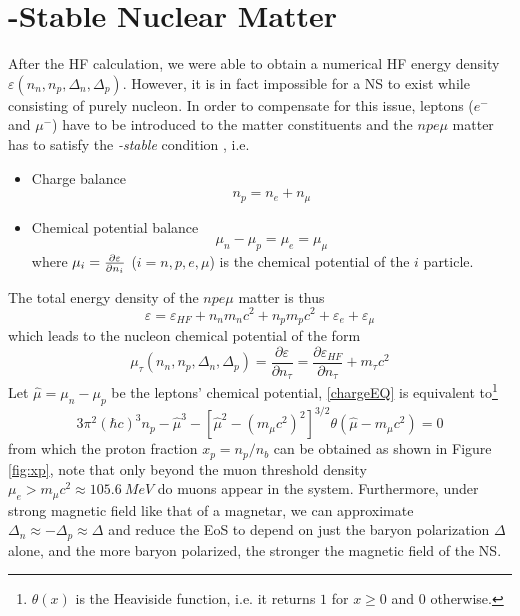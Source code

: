 \section{\textbeta-Stable Nuclear Matter}%
\label{sec:textbeta_stable_nuclear_matter}

After the \gls{HF} calculation, we were able to obtain a numerical \gls{HF} energy density $\varepsilon(n_n,n_p,\Delta_n,\Delta_p)$. However, it is in fact impossible for a \gls{NS} to exist while consisting of purely nucleon. In order to compensate for this issue, leptons ($e^-$ and $\mu^-$) have to be introduced to the matter constituents and the $npe\mu$ matter has to satisfy the \emph{\textbeta-stable} condition \citep{glendenning2012compact}, i.e.
\begin{itemize}
        \item Charge balance
                \begin{equation}
                        n_p = n_e + n_\mu
                        \label{chargeEQ}
                \end{equation}
        \item Chemical potential balance
                \begin{equation}
                        \mu_n - \mu_p = \mu_e = \mu_\mu
                \end{equation}
                where $\mu_i = \pdv{\varepsilon}{n_i}$ ($i=n,p,e,\mu$) is the chemical potential of the $i$ particle.
\end{itemize}
The total energy density of the $npe\mu$ matter is thus
\begin{equation}
        \varepsilon = \varepsilon_{HF} + n_n m_n c^2 + n_p m_p c^2 + \varepsilon_e + \varepsilon_\mu 
\end{equation}
which leads to the nucleon chemical potential of the form
\begin{equation}
        \mu_\tau (n_n,n_p,\Delta_n,\Delta_p) = \frac{\partial \varepsilon}{\partial n_\tau}  = \frac{\partial \varepsilon_{HF}}{\partial n_\tau} + m_\tau c^2
\end{equation}
Let $\hat{\mu} = \mu_n - \mu_p$ be the leptons' chemical potential, \eqref{chargeEQ} is equivalent to\footnote{$\theta(x)$ is the Heaviside function, i.e. it returns $1$ for $x\geq 0$ and $0$ otherwise.}
\begin{equation}
        3\pi^2 (\hbar c)^3 n_p - \hat{\mu}^3 - \left[ \hat{\mu}^2 - (m_\mu c^2)^2 \right]^{3/2} \theta(\hat{\mu} - m_\mu c^2) = 0
\end{equation}
from which the proton fraction $x_p = n_p/n_b$ can be obtained as shown in Figure \ref{fig:xp}, note that only beyond the muon threshold density $\mu_e > m_\mu c^2 \approx 105.6\:MeV$ do muons appear in the system. Furthermore, under strong magnetic field like that of a magnetar, we can approximate $\Delta_n \approx -\Delta_p \approx \Delta$ and reduce the \gls{EoS} to depend on just the baryon polarization $\Delta$ alone, and the more baryon polarized, the stronger the magnetic field of the \gls{NS}.\par
